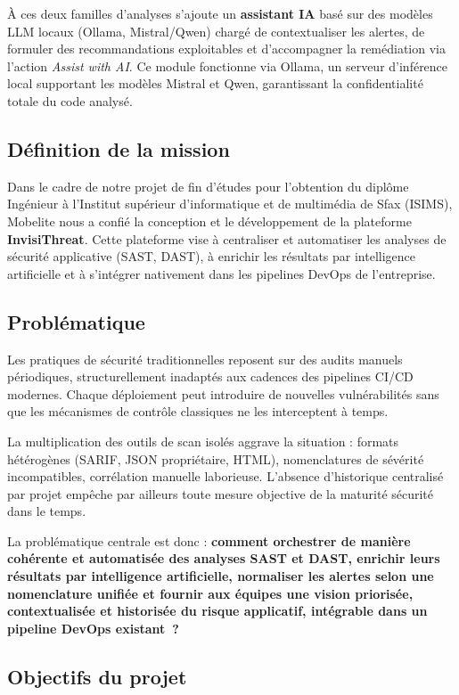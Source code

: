 À ces deux familles d'analyses s'ajoute un \textbf{assistant IA} basé sur des modèles LLM locaux (Ollama, Mistral/Qwen) chargé de contextualiser les alertes, de formuler des recommandations exploitables et d'accompagner la remédiation via l'action \textit{Assist with AI}. Ce module fonctionne via Ollama, un serveur d'inférence local supportant les modèles Mistral et Qwen, garantissant la confidentialité totale du code analysé.

\subsection{Définition de la mission}

Dans le cadre de notre projet de fin d'études pour l'obtention du diplôme Ingénieur à l’Institut supérieur d'informatique et de multimédia de Sfax (ISIMS), Mobelite nous a confié la conception et le développement de la plateforme \textbf{InvisiThreat}. Cette plateforme vise à centraliser et automatiser les analyses de sécurité applicative (SAST, DAST), à enrichir les résultats par intelligence artificielle et à s'intégrer nativement dans les pipelines DevOps de l'entreprise.

\subsection{Problématique}

Les pratiques de sécurité traditionnelles reposent sur des audits manuels périodiques, structurellement inadaptés aux cadences des pipelines CI/CD modernes. Chaque déploiement peut introduire de nouvelles vulnérabilités sans que les mécanismes de contrôle classiques ne les interceptent à temps.

La multiplication des outils de scan isolés aggrave la situation : formats hétérogènes (SARIF, JSON propriétaire, HTML), nomenclatures de sévérité incompatibles, corrélation manuelle laborieuse. L'absence d'historique centralisé par projet empêche par ailleurs toute mesure objective de la maturité sécurité dans le temps.

La problématique centrale est donc : \textbf{comment orchestrer de manière cohérente et automatisée des analyses SAST et DAST, enrichir leurs résultats par intelligence artificielle, normaliser les alertes selon une nomenclature unifiée et fournir aux équipes une vision priorisée, contextualisée et historisée du risque applicatif, intégrable dans un pipeline DevOps existant~?}

\subsection{Objectifs du projet}

